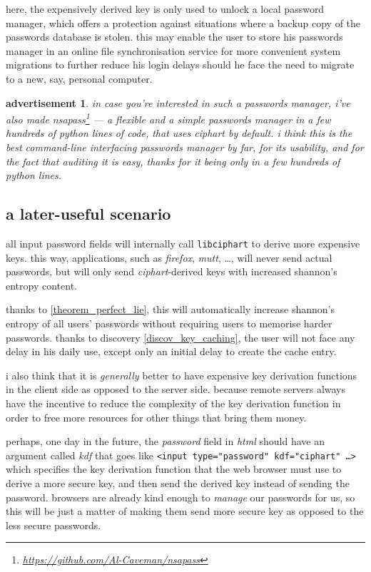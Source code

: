 \documentclass[twocolumn]{article}
\newtheorem{advertisement}{advertisement}[section]
\begin{document}
here, the expensively derived key is only used to unlock a local password
manager, which offers a protection against situations where a backup copy
of the passwords database is stolen.  this may enable the user to store his
passwords manager in an online file synchronisation service for more
convenient system migrations to further reduce his login delays should he
face the need to migrate to a new, say, personal computer.

\begin{advertisement}
    in case you're interested in such a passwords manager, i've also made
    \emph{nsapass}\footnote{\url{https://github.com/Al-Caveman/nsapass}}
    --- a flexible and a simple passwords manager in a few hundreds of
    python lines of code, that uses \emph{ciphart} by default.  i think
    this is the best command-line interfacing passwords manager by far, for
    its usability, and for the fact that auditing it is easy, thanks for it
    being only in a few hundreds of python lines.
\end{advertisement}

\subsection{a later-useful scenario}
all input password fields will internally call \texttt{libciphart} to
derive more expensive keys.  this way, applications, such as
\emph{firefox}, \emph{mutt}, \ldots, will never send actual passwords, but
will only send \emph{ciphart}-derived keys with increased shannon's entropy
content.

thanks to \cref{theorem_perfect_lie}, this will automatically
increase shannon's entropy of all users' passwords without requiring users
to memorise harder passwords.  thanks to discovery
\ref{discov_key_caching}, the user will not face any delay in his daily
use, except only an initial delay to create the cache entry.

i also think that it is \emph{generally} better to have expensive key
derivation functions in the client side as opposed to the server side.
because remote servers always have the incentive to reduce the complexity
of the key derivation function in order to free more resources for other
things that bring them money.

perhaps, one day in the future, the \emph{password} field in \emph{html}
should have an argument called \emph{kdf} that goes like \texttt{<input
type="password" kdf="ciphart" \ldots>} which specifies the key derivation
function that the web browser must use to derive a more secure key, and
then send the derived key instead of sending the password.  browsers are
already kind enough to \emph{manage} our passwords for us, so this will be
just a matter of making them send more secure key as opposed to the less
secure passwords.  
\end{document}
